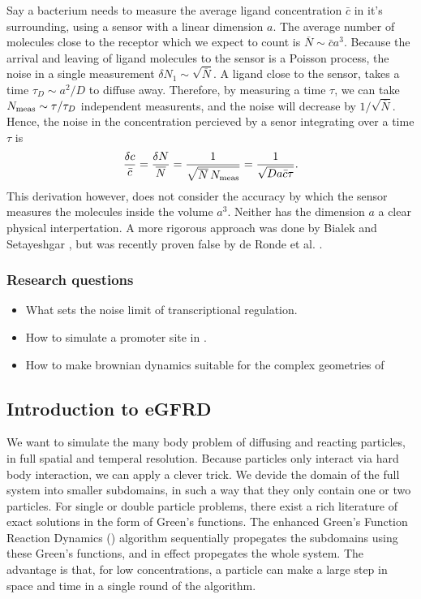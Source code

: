 Say a bacterium needs to measure the average ligand concentration $\bar{c}$ in it's surrounding, using a sensor with a linear dimension $a$. The average number of molecules close to the receptor which we expect to count is $\overline{N} \sim \bar{c} a^3$. Because the arrival and leaving of ligand molecules to the sensor is a Poisson process, the noise in a single measurement $\delta N_1 \sim \sqrt{\overline{N}}$. A ligand close to the sensor, takes a time $\tau_D \sim a^2/D$ to diffuse away. Therefore, by measuring a time $\tau$, we can take $N_{\rm meas} \sim \tau/\tau_D$ independent measurents, and the noise will decrease by $1/\sqrt{\overline{N}}$. Hence, the noise in the concentration percieved by a senor integrating over a time $\tau$ is
\begin{equation}
 \frac{\delta c}{\bar{c}} = \frac{\delta N}{\overline{N}} = \frac{1}{\sqrt{\overline{N}\,N_{\rm meas}}} = \frac{1}{\sqrt{D a \bar{c} \tau}}.
\end{equation}
This derivation however, does not consider the accuracy by which the sensor measures the molecules inside the volume $a^3$. Neither has the dimension $a$ a clear physical interpertation. A more rigorous approach was done by Bialek and Setayeshgar \cite{Bialek2005}, but was recently proven false by de Ronde et al. \cite{DeRonde2012}. 


\subsubsection{Research questions}
\begin{itemize}
 \item What sets the noise limit of transcriptional regulation.
 \item How to simulate a promoter site in \GFRD.
 \item How to make brownian dynamics suitable for the complex geometries of \GFRD
\end{itemize}



\subsection{Introduction to eGFRD}
We want to simulate the many body problem of diffusing and reacting particles, in full spatial and temperal resolution. Because particles only interact via hard body interaction, we can apply a clever trick. We devide the domain of the full system into smaller subdomains, in such a way that they only contain one or two particles. For single or double particle problems, there exist a rich literature of exact solutions in the form of Green's functions. The enhanced Green's Function Reaction Dynamics (\GFRD) algorithm sequentially propegates the subdomains using these Green's functions, and in effect propegates the whole system. \cite{VanZon2006}\cite{VanZon2005}\cite{Takahashi2010} The advantage is that, for low concentrations, a particle can make a large step in space and time in a single round of the algorithm.

